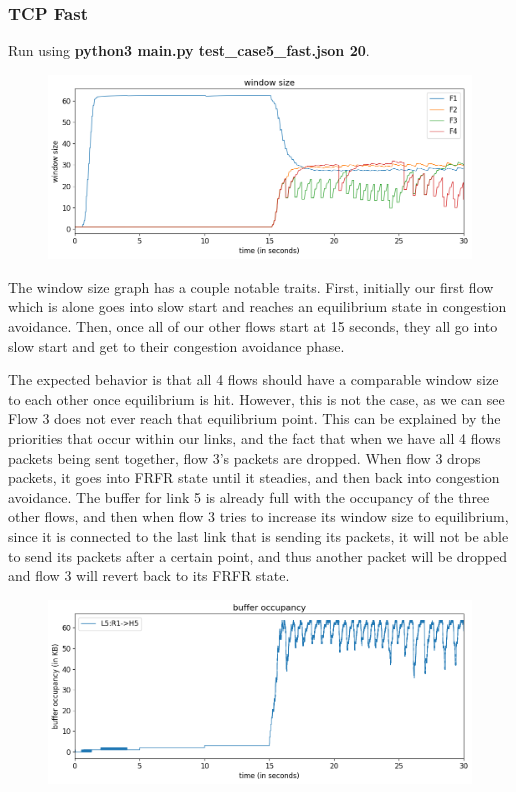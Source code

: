\documentclass{article}
\begin{document}
\subsubsection{TCP Fast}

Run using \textbf{python3 main.py test\_case5\_fast.json 20}.

\begin{figure}[H]
\centering
\includegraphics[width = \textwidth]{"test_case5_fast window size"}
\end{figure}


The window size graph has a couple notable traits. First, initially our first flow which is alone goes into slow start and reaches an equilibrium state in congestion avoidance. Then, once all of our other flows start at 15 seconds, they all go into slow start and get to their congestion avoidance phase. 

The expected behavior is that all 4 flows should have a comparable window size to each other once equilibrium is hit. However, this is not the case, as we can see Flow 3 does not ever reach that equilibrium point. This can be explained by the priorities that occur within our links, and the fact that when we have all 4 flows packets being sent together, flow 3's packets are dropped. When flow 3 drops packets, it goes into FRFR state until it steadies, and then back into congestion avoidance. The buffer for link 5 is already full with the occupancy of the three other flows, and then when flow 3 tries to increase its window size to equilibrium, since it is connected to the last link that is sending its packets, it will not be able to send its packets after a certain point, and thus another packet will be dropped and flow 3 will revert back to its FRFR state. 

\begin{figure}[H]
\centering
\includegraphics[width = \textwidth]{"test_case5_fast buffer occupancy"}
\end{figure}
\end{document}
